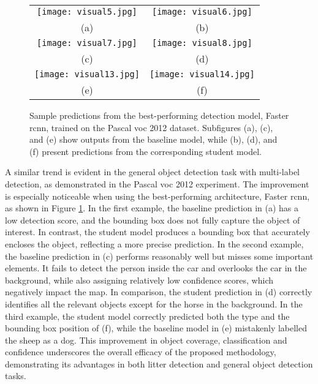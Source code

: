 \begin{figure}[!ht]
  \centering
  \begin{tabular}{cc}
    \texttt{[image: visual5.jpg]} &
    \texttt{[image: visual6.jpg]} \\
    \small (a) & \small (b) \\
    \addlinespace[1em]
    \texttt{[image: visual7.jpg]} &
    \texttt{[image: visual8.jpg]} \\
    \small (c) & \small (d) \\
    \addlinespace[1em]
    \texttt{[image: visual13.jpg]} &
    \texttt{[image: visual14.jpg]} \\
    \small (e) & \small (f) \\
  \end{tabular}
  \caption{Sample predictions from the best-performing detection model, Faster \gls{rcnn}, trained on the Pascal \gls{voc} 2012 dataset. Subfigures (a), (c), and (e) show outputs from the baseline model, while (b), (d), and (f) present predictions from the corresponding student model.}
  \label{fig:visuals_pascal_voc}
\end{figure}

A similar trend is evident in the general object detection task with multi-label detection, as demonstrated in the Pascal \gls{voc} 2012 experiment. The improvement is especially noticeable when using the best-performing architecture, Faster \gls{rcnn}, as shown in Figure \ref{fig:visuals_pascal_voc}.
In the first example, the baseline prediction in (a) has a low detection score, and the bounding box does not fully capture the object of interest. In contrast, the student model produces a bounding box that accurately encloses the object, reflecting a more precise prediction. In the second example, the baseline prediction in (c) performs reasonably well but misses some important elements. It fails to detect the person inside the car and overlooks the car in the background, while also assigning relatively low confidence scores, which negatively impact the \gls{map}.
In comparison, the student prediction in (d) correctly identifies all the relevant objects except for the horse in the background. 
In the third example, the student model correctly predicted both the type and the bounding box position of (f), while the baseline model in (e) mistakenly labelled the sheep as a dog. This improvement in object coverage, classification and confidence underscores the overall efficacy of the proposed methodology, demonstrating its advantages in both litter detection and general object detection tasks.


